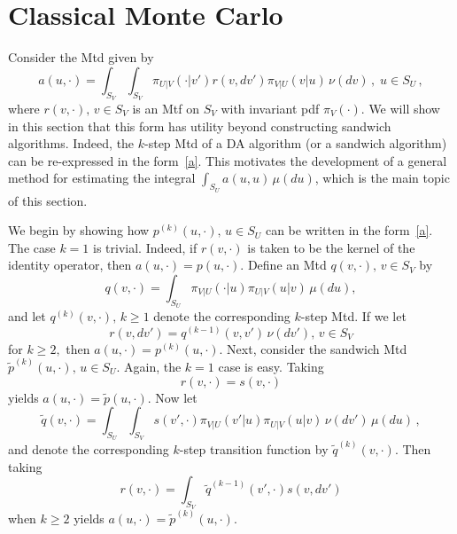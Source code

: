 \documentclass[11pt]{article}
\begin{document}
	\section{Classical Monte Carlo} \label{MC}
	Consider the Mtd given by
	\begin{equation} \label{a} a(u, \cdot) = \int_{S_V}\int_{S_V}
          \pi_{U|V}(\cdot|v') r(v,dv') \pi_{V|U}(v|u) \, \nu(dv) \,, \; u \in S_U \,,
	\end{equation}
	where $r(v,\cdot), \, v \in S_V$ is an Mtf on $S_V$ with
        invariant pdf $\pi_V(\cdot).$ We will show in this section
        that this form has utility beyond constructing sandwich
        algorithms.  Indeed, the $k$-step Mtd of a DA algorithm (or a
        sandwich algorithm) can be re-expressed in the
        form~\eqref{a}. This motivates the development of a general
        method for estimating the integral $\int_{S_U} a(u,u) \,
        \mu(du)$, which is the main topic of this section.
	
	We begin by showing how $p^{(k)}(u,\cdot), \, u \in S_U$ can
        be written in the form~\eqref{a}.  The case $k=1$ is trivial.
        Indeed, if $r(v,\cdot)$ is taken to be the kernel of the
        identity operator, then $a(u,\cdot) = p(u,\cdot)$.  Define an
        Mtd $q(v,\cdot), \, v\in S_V$ by
	\[
	q(v,\cdot) = \int_{S_U} \pi_{V|U}(\cdot|u) \pi_{U|V}(u|v) \, \mu(du),
	\]
	and let $q^{(k)}(v,\cdot), \, k \geq 1$ denote the
        corresponding $k$-step Mtd. If we let
	\[
	r(v,dv')= q^{(k-1)}(v,v') \, \nu(dv'), \, v \in S_V
	\]
	for $k \geq 2,$ then $a(u,\cdot) = p^{(k)}(u,\cdot)$. Next,
        consider the sandwich Mtd $\tilde{p}^{(k)}(u,\cdot), \, u \in
        S_U$.  Again, the $k=1$ case is easy.  Taking
	\[
	r(v,\cdot) = s(v,\cdot)
	\]
	yields $a(u,\cdot) = \tilde{p}(u,\cdot)$.  Now let
	\[
	\tilde{q}(v,\cdot) = \int_{S_U} \int_{S_V} s(v',\cdot)
        \pi_{V|U}(v'|u) \pi_{U|V}(u|v)\, \nu(dv')\, \mu(du) \,,
	\]
	and denote the corresponding $k$-step transition function by
        $\tilde{q}^{(k)}(v,\cdot)$.  Then taking
	\[
	r(v,\cdot) = \int_{S_V} \tilde{q}^{(k-1)}(v',\cdot) s(v,dv')
	\]
	when $k \geq 2$ yields $a(u,\cdot) = \tilde{p}^{(k)}(u,\cdot).$
	
\end{document}
